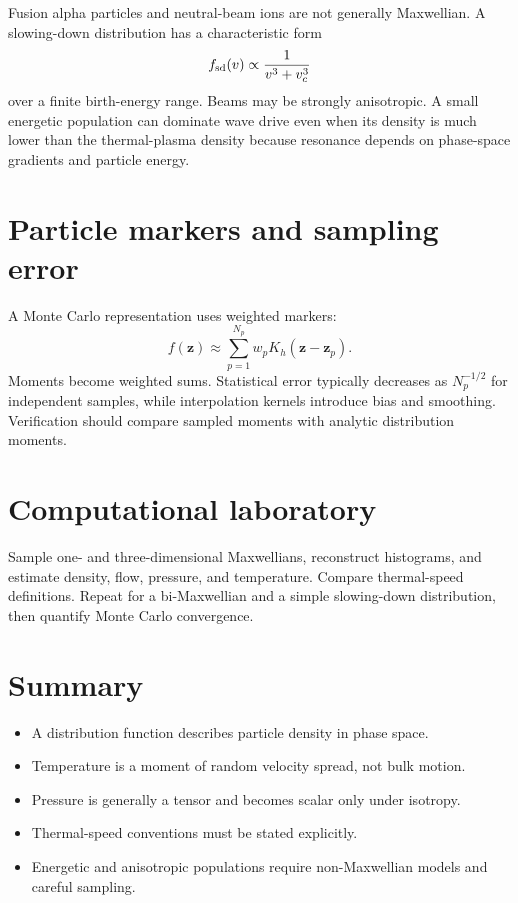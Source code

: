 \documentclass[11pt]{article}
\begin{document}
Fusion alpha particles and neutral-beam ions are not generally Maxwellian. A slowing-down distribution has a characteristic form
\begin{equation}
f_{\rm sd}(v)\propto\frac{1}{v^3+v_c^3}
\end{equation}
over a finite birth-energy range. Beams may be strongly anisotropic. A small energetic population can dominate wave drive even when its density is much lower than the thermal-plasma density because resonance depends on phase-space gradients and particle energy.


\section{Particle markers and sampling error}

A Monte Carlo representation uses weighted markers:
\begin{equation}
f(\mathbf z)\approx\sum_{p=1}^{N_p}w_pK_h(\mathbf z-\mathbf z_p).
\end{equation}
Moments become weighted sums. Statistical error typically decreases as $N_p^{-1/2}$ for independent samples, while interpolation kernels introduce bias and smoothing. Verification should compare sampled moments with analytic distribution moments.


\section{Computational laboratory}
Sample one- and three-dimensional Maxwellians, reconstruct histograms, and estimate density, flow, pressure, and temperature. Compare thermal-speed definitions. Repeat for a bi-Maxwellian and a simple slowing-down distribution, then quantify Monte Carlo convergence.

\section{Summary}
\begin{itemize}[leftmargin=1.6em]
\item A distribution function describes particle density in phase space.
\item Temperature is a moment of random velocity spread, not bulk motion.
\item Pressure is generally a tensor and becomes scalar only under isotropy.
\item Thermal-speed conventions must be stated explicitly.
\item Energetic and anisotropic populations require non-Maxwellian models and careful sampling.
\end{itemize}
\end{document}
